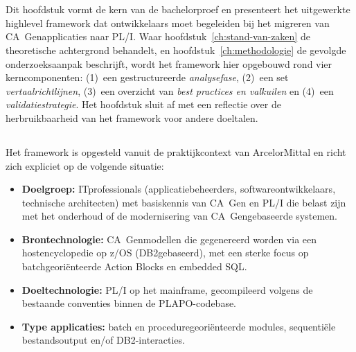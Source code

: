 
\chapter{}%
\label{ch:framework}

Dit hoofdstuk vormt de kern van de bachelorproef en presenteert het uitgewerkte high\-level framework dat 
ontwikkelaars moet begeleiden bij het migreren van CA~Gen\-applicaties naar PL/I. Waar hoofdstuk~\ref{ch:stand-van-zaken} 
de theoretische achtergrond behandelt, en hoofdstuk~\ref{ch:methodologie} 
de gevolgde onderzoeksaanpak beschrijft, wordt het framework hier opgebouwd rond vier kerncomponenten: 
(1)~een gestructureerde \emph{analysefase}, (2)~een set \emph{vertaalrichtlijnen}, 
(3)~een overzicht van \emph{best practices en valkuilen} en (4)~een \emph{validatiestrategie}. Het hoofdstuk 
sluit af met een reflectie over de herbruikbaarheid van het framework voor andere doeltalen.

\section{}%
\label{sec:framework-scope}

Het framework is opgesteld vanuit de praktijkcontext van ArcelorMittal en richt zich expliciet op de 
volgende situatie:

\begin{itemize}
    \item \textbf{Doelgroep:} IT\-professionals (applicatiebeheerders, softwareontwikkelaars, technische 
    architecten) met basiskennis van CA~Gen en PL/I die belast zijn met het onderhoud of de modernisering 
    van CA~Gen\-gebaseerde systemen.
    \item \textbf{Brontechnologie:} CA~Gen\-modellen die gegenereerd worden via een host\-encyclopedie op 
    z/OS (DB2\-gebaseerd), met een sterke focus op batch\-georiënteerde Action Blocks en embedded SQL.
    \item \textbf{Doeltechnologie:} PL/I op het mainframe, gecompileerd volgens de bestaande conventies 
    binnen de PLAPO-codebase.
    \item \textbf{Type applicaties:} batch\- en procedure\-georiënteerde modules, sequentiële bestandsoutput en/of DB2-interacties.
\end{itemize}

